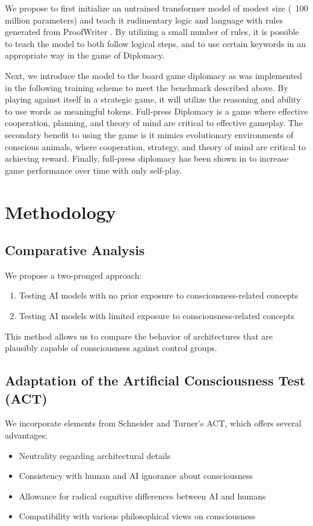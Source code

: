 \documentclass{article}
\begin{document}
We propose to first initialize an untrained transformer model of modest size (~100 million parameters) and teach it rudimentary logic and language with rules generated from ProofWriter \citep{tafjord2021proofwritergeneratingimplicationsproofs}. By utilizing a small number of rules, it is possible to teach the model to both follow logical steps, and to use certain keywords in an appropriate way in the game of Diplomacy.

Next, we introduce the model to the board game diplomacy as was implemented in \citep{fair2022diplomacy} 
the following training scheme to meet the benchmark described above. By playing against itself in a strategic game, it will utilize the reasoning and ability to use words as meaningful tokens. Full-press Diplomacy is a game where effective cooperation, planning, and theory of mind are critical to effective gameplay. The secondary benefit to using the game is it mimics evolutionary environments of conscious animals, where cooperation, strategy, and theory of mind are critical to achieving reward. Finally, full-press diplomacy has been shown in \citep{fair2022diplomacy} to increase game performance over time with only self-play.

\section{Methodology}

\subsection{Comparative Analysis}
We propose a two-pronged approach:
\begin{enumerate}
    \item Testing AI models with no prior exposure to consciousness-related concepts
    \item Testing AI models with limited exposure to consciousness-related concepts
\end{enumerate}

This method allows us to compare the behavior of architectures that are plausibly capable of consciousness against control groups.

\subsection{Adaptation of the Artificial Consciousness Test (ACT)}
We incorporate elements from Schneider and Turner's ACT, which offers several advantages:
\begin{itemize}
    \item Neutrality regarding architectural details
    \item Consistency with human and AI ignorance about consciousness
    \item Allowance for radical cognitive differences between AI and humans
    \item Compatibility with various philosophical views on consciousness
\end{itemize}
\end{document}
